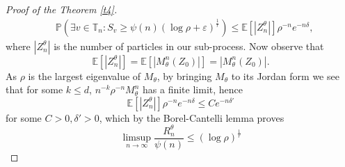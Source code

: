 \documentclass[12pt]{article}
\numberwithin{equation}{section}
\begin{document}
\begin{proof}[Proof of the Theorem \ref{t4}]
\begin{equation}
\begin{aligned}
    &\mathbb{P}\left(\exists v \in \mathbb{T}_n : S_v \geq \psi(n) (\log \rho + \varepsilon)^{\frac 1 r}\right) \leq 
    \mathbb{E}[|Z^\theta_n|] \rho^{-n} e^{ -n \delta},
\end{aligned}
\end{equation}
where $|Z^\theta_n|$ is the number of particles in our sub-process. Now observe that
\[
\mathbb{E}[|Z^\theta_n|] = \mathbb{E}\left[\left|M^n_\theta\left(Z_0\right)\right|\right] = \left|M^n_\theta\left(Z_0\right)\right|.
\]
As $\rho$ is the largest eigenvalue of $M_\theta$, by bringing $M_\theta$ to its Jordan form we see that for some $k\leq d$, $n^{-k}\rho^{-n} M_\theta^n$ has a finite limit, hence 
\[\mathbb{E}[|Z^\theta_n|] \rho^{-n} e^{ -n \delta} \leq C e^{-n\delta'}\]
for some $C>0, \delta' >0$, which by the Borel-Cantelli lemma proves
\begin{equation}\label{t4:lim}
    \limsup_{n \rightarrow \infty} \frac {R^\theta_n} {\psi(n)} \leq \left(\log \rho\right)^{\frac 1 r}
\end{equation}



\end{proof}
\end{document}
